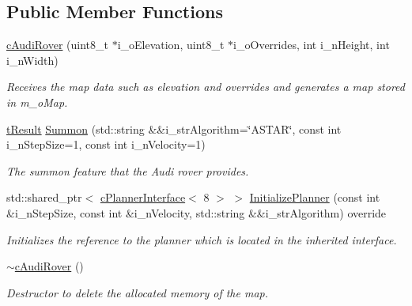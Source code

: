 \subsection*{Public Member Functions}
\begin{DoxyCompactItemize}
\item 
\mbox{\hyperlink{classplanner_1_1c_audi_rover_abafb926aca93fb8382284a10bd341986}{c\+Audi\+Rover}} (uint8\+\_\+t $\ast$i\+\_\+o\+Elevation, uint8\+\_\+t $\ast$i\+\_\+o\+Overrides, int i\+\_\+n\+Height, int i\+\_\+n\+Width)
\begin{DoxyCompactList}\small\item\em Receives the map data such as elevation and overrides and generates a map stored in m\+\_\+o\+Map. \end{DoxyCompactList}\item 
\mbox{\hyperlink{structt_result}{t\+Result}} \mbox{\hyperlink{classplanner_1_1c_audi_rover_ab43943af331caf76ac442280f1c667be}{Summon}} (std\+::string \&\&i\+\_\+str\+Algorithm=\char`\"{}A\+S\+T\+AR\char`\"{}, const int i\+\_\+n\+Step\+Size=1, const int i\+\_\+n\+Velocity=1)
\begin{DoxyCompactList}\small\item\em The summon feature that the Audi rover provides. \end{DoxyCompactList}\item 
std\+::shared\+\_\+ptr$<$ \mbox{\hyperlink{classplanner_1_1c_planner_interface}{c\+Planner\+Interface}}$<$ 8 $>$ $>$ \mbox{\hyperlink{classplanner_1_1c_audi_rover_a892dfcdf781ccdfe95f5af808f5a24ac}{Initialize\+Planner}} (const int \&i\+\_\+n\+Step\+Size, const int \&i\+\_\+n\+Velocity, std\+::string \&\&i\+\_\+str\+Algorithm) override
\begin{DoxyCompactList}\small\item\em Initializes the reference to the planner which is located in the inherited interface. \end{DoxyCompactList}\item 
\mbox{\label{classplanner_1_1c_audi_rover_a9057332995c0ac8a286551345aee9cc7}} 
\mbox{\hyperlink{classplanner_1_1c_audi_rover_a9057332995c0ac8a286551345aee9cc7}{$\sim$c\+Audi\+Rover}} ()
\begin{DoxyCompactList}\small\item\em Destructor to delete the allocated memory of the map. \end{DoxyCompactList}\item 

\end{DoxyCompactItemize}
